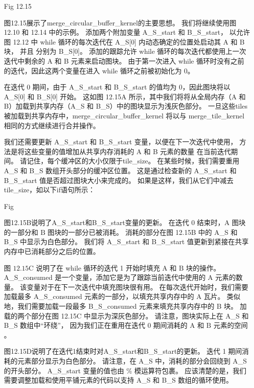 {\color{red} Fig 12.15}

图12.15展示了merge\_circular\_buffer\_kernel的主要思想。 我们将继续使用图 12.10 和 12.14 中的示例。 
添加两个附加变量 A\_S\_start 和 B\_S\_start，
以允许图 12.12 中 while 循环的每次迭代在 A\_S[0] 内动态确定的位置处启动其 A 和 B 块，
并且 分别为 B\_S[0]。 添加的跟踪允许 while 循环的每次迭代都使用上一次迭代中剩余的 A 和 B 元素来启动图块。 
由于第一次进入 while 循环时没有之前的迭代，因此这两个变量在进入 while 循环之前被初始化为 0。

在迭代 0 期间，由于 A\_S\_start 和 B\_S\_start 的值均为 0，因此图块将以 A\_S[0] 和 B\_S[0] 开始。 
这如图 12.15A 所示，其中我们将将从全局内存（A 和 B）加载到共享内存（A\_S 和 B\_S）中的图块显示为浅灰色部分。 
一旦这些tiles被加载到共享内存中，merge\_circular\_buffer\_kernel 
将以与 merge\_tile\_kernel 相同的方式继续进行合并操作。

我们还需要更新 A\_S\_start 和 B\_S\_start 变量，以便在下一次迭代中使用，
方法是将这些变量的值增加从共享内存消耗的 $\mathrm{A}$ 和 B 元素的数量 在当前迭代期间。 
请记住，每个缓冲区的大小仅限于tile\_size。 在某些时候，我们需要重用 A\_S 和 B\_S 数组开头部分的缓冲区位置。 
这是通过检查新的 A\_S\_start 和 B\_S\_start 值是否超过图块大小来完成的。 
如果是这样，我们从它们中减去tile\_size，如以下if语句所示：

{\color{red} Fig}

图12.15B说明了A\_S\_start和B\_S\_start变量的更新。 
在迭代 0 结束时，$\mathrm{A}$ 图块的一部分和 $\mathrm{B}$ 图块的一部分已被消耗。 
消耗的部分在图 12.15B 中的 A\_S 和 B\_S 中显示为白色部分。 
我们将 A\_S\_start 和 B\_S\_start 值更新到紧接在共享内存中已消耗部分之后的位置。

图 $12.15 \mathrm{C}$ 说明了在 while 循环的迭代 1 开始时填充 $\mathrm{A}$ 和 $\mathrm{B}$ 块的操作。 
A\_S\_consumed 是一个变量，添加它是为了跟踪当前迭代中使用的 $\mathrm{A}$ 元素的数量。 
该变量对于在下一次迭代中填充图块很有用。 
在每次迭代开始时，我们需要加载最多 A\_S\_consumed 元素的一部分，以填充共享内存中的 A 瓦片。 
类似地，我们需要加载一段最多 B\_S\_consumed 元素来填充共享内存中的 B 块。 
加载的两个部分在图 12.15C 中显示为深灰色部分。 
请注意，图块实际上在 A\_S 和 B\_S 数组中“环绕”，
因为我们正在重用在迭代 0 期间消耗的 $\mathrm{A}$ 和 $\mathrm{B}$ 元素的空间 。

图12.15D说明了在迭代1结束时对A\_S\_start和B\_S\_start的更新。 迭代 1 期间消耗的元素部分显示为白色部分。 
请注意，在 A\_S 中，消耗的部分会回绕到 A\_S 的开头部分。 A\_S\_start 变量的值也由 \% 模运算符包裹。 
应该清楚的是，我们需要调整加载和使用平铺元素的代码以支持 A\_S 和 B\_S 数组的循环使用。


